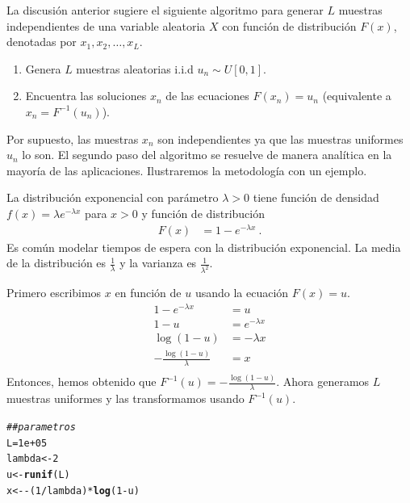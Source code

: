 \documentclass[12pt,reqno]{amsart}\usepackage[]{graphicx}\usepackage[]{color}
\makeatletter
\newcommand{\hlnum}[1]{\textcolor[rgb]{0.686,0.059,0.569}{#1}}%
\newcommand{\hlcom}[1]{\textcolor[rgb]{0.678,0.584,0.686}{\textit{#1}}}%
\newcommand{\hlopt}[1]{\textcolor[rgb]{0,0,0}{#1}}%
\newcommand{\hlstd}[1]{\textcolor[rgb]{0.345,0.345,0.345}{#1}}%
\newcommand{\hlkwb}[1]{\textcolor[rgb]{0.69,0.353,0.396}{#1}}%
\newcommand{\hlkwd}[1]{\textcolor[rgb]{0.737,0.353,0.396}{\textbf{#1}}}%
\newenvironment{kframe}{%
 \def\at@end@of@kframe{}%
 \ifinner\ifhmode%
  \def\at@end@of@kframe{\end{minipage}}%
  \begin{minipage}{\columnwidth}%
 \fi\fi%
 \def\FrameCommand##1{\hskip\@totalleftmargin \hskip-\fboxsep
 \colorbox{shadecolor}{##1}\hskip-\fboxsep
     \hskip-\linewidth \hskip-\@totalleftmargin \hskip\columnwidth}%
 \MakeFramed {\advance\hsize-\width
   \@totalleftmargin\z@ \linewidth\hsize
   \@setminipage}}%
 {\par\unskip\endMakeFramed%
 \at@end@of@kframe}
\newenvironment{knitrout}{}{} %
\makeatother
\begin{document}
La discusión anterior sugiere el siguiente algoritmo para generar $L$ muestras independientes de una variable aleatoria $X$ con función de distribución $F(x)$, denotadas por $x_1,x_2,\ldots, x_L$.
\begin{enumerate}
\item Genera $L$ muestras aleatorias i.i.d $u_{n}\sim U[0,1]$.
\item Encuentra las soluciones $x_n$ de las ecuaciones $F(x_n)=u_n$ (equivalente a $x_n = F^{-1}(u_n)$).
\end{enumerate}
Por supuesto, las muestras $x_n$ son independientes ya que las muestras uniformes $u_n$ lo son. El segundo paso del algoritmo se resuelve de manera analítica en la mayoría de las aplicaciones. Ilustraremos la metodología con un ejemplo.

La distribución exponencial con parámetro $\lambda>0$ tiene función de densidad $f(x) = \lambda e^{-\lambda x}$ para $x>0$ y función de distribución
\begin{equation}\label{distribucionExp}
  \begin{split}
  F(x) &= 1-e^{-\lambda x}\:.
  \end{split}
\end{equation}
Es común modelar tiempos de espera con la distribución exponencial. La media de la distribución es $\frac{1}{\lambda}$ y la varianza es $\frac{1}{\lambda^2}$. 

Primero escribimos $x$ en función de $u$ usando la ecuación $F(x) = u$.
\begin{equation*}
  \begin{split}
  1-e^{-\lambda x} &= u \\
  1-u &= e^{-\lambda x} \\
  \log(1-u) &= -\lambda x\\
  -\frac{\log(1-u)}{\lambda} &= x\\
  \end{split}
\end{equation*}
Entonces, hemos obtenido que $F^{-1}(u) = -\frac{\log(1-u)}{\lambda} $. Ahora generamos $L$ muestras uniformes y las transformamos usando $F^{-1}(u)$.
\begin{knitrout}
\color{fgcolor}\begin{kframe}
\begin{alltt}
\hlcom{## parametros}
\hlstd{L} \hlkwb{=} \hlnum{1e+05}
\hlstd{lambda} \hlkwb{<-} \hlnum{2}
\hlstd{u} \hlkwb{<-} \hlkwd{runif}\hlstd{(L)}
\hlstd{x} \hlkwb{<-} \hlopt{-}\hlstd{(}\hlnum{1}\hlopt{/}\hlstd{lambda)} \hlopt{*} \hlkwd{log}\hlstd{(}\hlnum{1} \hlopt{-} \hlstd{u)}
\end{alltt}
\end{kframe}
\end{knitrout}
\end{document}

